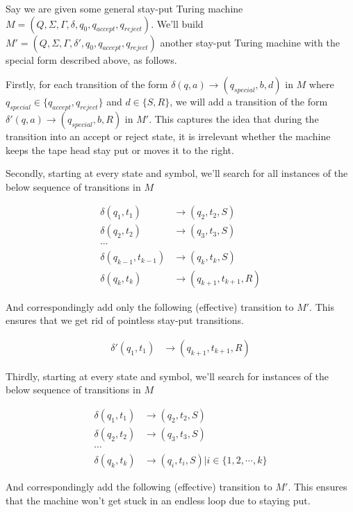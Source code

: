 \documentclass{article}
\begin{document}
Say we are given some general stay-put Turing machine $M = (Q, \Sigma, \Gamma, \delta, q_0, q_{accept}, q_{reject})$. We'll build $M' = (Q, \Sigma, \Gamma, \delta', q_0, q_{accept}, q_{reject})$ another stay-put Turing machine with the special form described above, as follows.

Firstly, for each transition of the form $\delta(q, a) \rightarrow (q_{special}, b, d)$ in $M$ where $q_{special} \in \{q_{accept}, q_{reject}\}$ and $d \in \{S, R\}$, we will add a transition of the form $\delta'(q, a) \rightarrow (q_{special}, b, R)$ in $M'$. This captures the idea that during the transition into an accept or reject state, it is irrelevant whether the machine keeps the tape head stay put or moves it to the right.

Secondly, starting at every state and symbol, we'll search for all instances of the below sequence of transitions in $M$

\begin{align*}
    \delta(q_1, t_1)             & \rightarrow (q_2, t_2, S) \\
    \delta(q_2, t_2)             & \rightarrow (q_3, t_3, S) \\
    \cdots \\
    \delta(q_{k - 1}, t_{k - 1}) & \rightarrow (q_k, t_k, S) \\
    \delta(q_k, t_k)             & \rightarrow (q_{k + 1}, t_{k + 1}, R)
\end{align*}

And correspondingly add only the following (effective) transition to $M'$. This ensures that we get rid of pointless stay-put transitions.

\begin{align*}
    \delta'(q_1, t_1) & \rightarrow (q_{k + 1}, t_{k + 1}, R)
\end{align*}

Thirdly, starting at every state and symbol, we'll search for instances of the below sequence of transitions in $M$

\begin{align*}
    \delta(q_1, t_1)             & \rightarrow (q_2, t_2, S) \\
    \delta(q_2, t_2)             & \rightarrow (q_3, t_3, S) \\
    \cdots \\
    \delta(q_k, t_k)             & \rightarrow (q_i, t_i, S) | i \in \{1, 2, \cdots , k\}
\end{align*}

And correspondingly add the following (effective) transition to $M'$. This ensures that the machine won't get stuck in an endless loop due to staying put.
\end{document}
